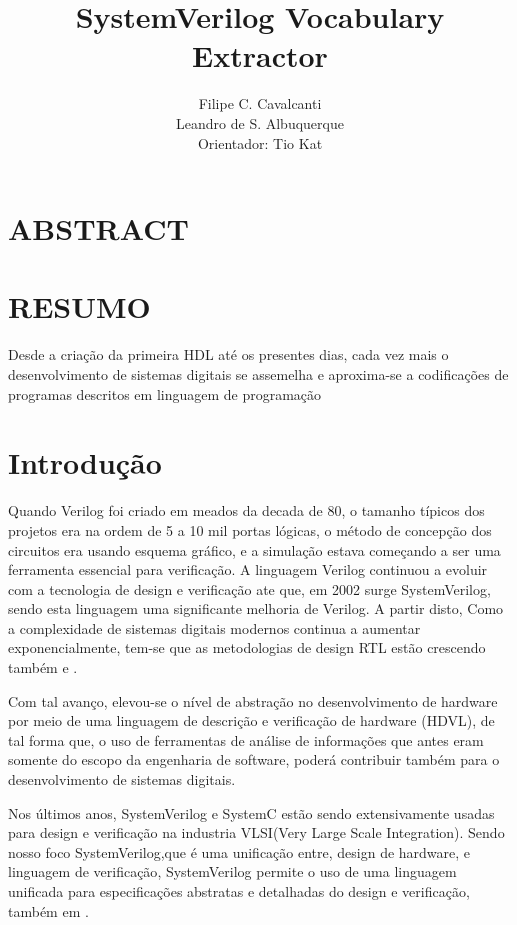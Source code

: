 \documentclass[12pt, twocolumn, a4paper]{article}
\begin{document}
	\title{SystemVerilog Vocabulary Extractor}
	\author{Filipe C. Cavalcanti\\ Leandro de S. Albuquerque\\
	Orientador: Tio Kat}
	\maketitle
	
	\section{ABSTRACT}
	
	\section{RESUMO}
	\quad Desde a criação da primeira HDL até os presentes dias, cada vez mais o desenvolvimento de sistemas digitais se assemelha e aproxima-se a codificações de programas descritos em linguagem de programação  
	
	
	\section{Introdução}
\quad Quando Verilog foi criado em meados da decada de 80, o tamanho típicos dos projetos era na ordem de 5 a 10 mil portas lógicas, o método de concepção dos circuitos era usando esquema gráfico, e a simulação estava começando a ser uma ferramenta essencial para verificação\cite{sutherland2006}. A linguagem Verilog continuou a evoluir com a tecnologia de design e verificação ate que, em 2002 surge SystemVerilog, sendo esta linguagem uma significante melhoria de Verilog\cite{sutherland2006}. A partir disto, Como a complexidade de sistemas digitais modernos continua a aumentar exponencialmente, tem-se que as metodologias de design RTL estão crescendo também\cite{Marc-Andre} e \cite{Hahanov2008}.

Com tal avanço, elevou-se o nível de abstração no desenvolvimento de hardware por meio de uma linguagem de descrição e verificação de hardware (HDVL), de tal forma que, o uso de ferramentas de análise de informações que antes eram somente do escopo da engenharia de software, poderá contribuir também para o desenvolvimento de sistemas digitais.

Nos últimos anos, SystemVerilog e SystemC estão sendo extensivamente usadas para design e verificação na industria VLSI(Very Large Scale Integration)\cite{Kumar2014}. Sendo nosso foco SystemVerilog,que é uma unificação entre, design de hardware, e linguagem de verificação\cite{IEEEComputerSociety2013}, SystemVerilog permite o uso de uma linguagem unificada para especificações abstratas e detalhadas do design e verificação, também em \cite{IEEEComputerSociety2013}.
\end{document}
